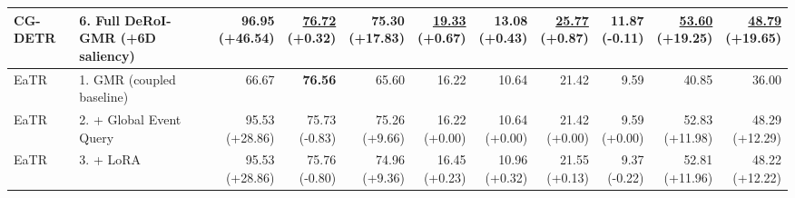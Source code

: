 \documentclass{article}
\begin{document}
{\begin{tabular}{llrrrrrrrrr}
CG-DETR & 6. Full DeRoI-GMR (+6D saliency) & \shortstack{\textbf{96.95} \\ {\scriptsize (+46.54)}} & \shortstack{\underline{76.72} \\ {\scriptsize (+0.32)}} & \shortstack{75.30 \\ {\scriptsize (+17.83)}} & \shortstack{\underline{19.33} \\ {\scriptsize (+0.67)}} & \shortstack{13.08 \\ {\scriptsize (+0.43)}} & \shortstack{\underline{25.77} \\ {\scriptsize (+0.87)}} & \shortstack{11.87 \\ {\scriptsize (-0.11)}} & \shortstack{\underline{53.60} \\ {\scriptsize (+19.25)}} & \shortstack{\underline{48.79} \\ {\scriptsize (+19.65)}} \\
\midrule
EaTR & 1. GMR (coupled baseline) & 66.67 & \textbf{76.56} & 65.60 & 16.22 & 10.64 & 21.42 & 9.59 & 40.85 & 36.00 \\
EaTR & 2. + Global Event Query & \shortstack{95.53 \\ {\scriptsize (+28.86)}} & \shortstack{75.73 \\ {\scriptsize (-0.83)}} & \shortstack{75.26 \\ {\scriptsize (+9.66)}} & \shortstack{16.22 \\ {\scriptsize (+0.00)}} & \shortstack{10.64 \\ {\scriptsize (+0.00)}} & \shortstack{21.42 \\ {\scriptsize (+0.00)}} & \shortstack{9.59 \\ {\scriptsize (+0.00)}} & \shortstack{52.83 \\ {\scriptsize (+11.98)}} & \shortstack{48.29 \\ {\scriptsize (+12.29)}} \\
EaTR & 3. + LoRA & \shortstack{95.53 \\ {\scriptsize (+28.86)}} & \shortstack{75.76 \\ {\scriptsize (-0.80)}} & \shortstack{74.96 \\ {\scriptsize (+9.36)}} & \shortstack{16.45 \\ {\scriptsize (+0.23)}} & \shortstack{10.96 \\ {\scriptsize (+0.32)}} & \shortstack{21.55 \\ {\scriptsize (+0.13)}} & \shortstack{9.37 \\ {\scriptsize (-0.22)}} & \shortstack{52.81 \\ {\scriptsize (+11.96)}} & \shortstack{48.22 \\ {\scriptsize (+12.22)}} \\

\end{tabular}}
\end{document}
